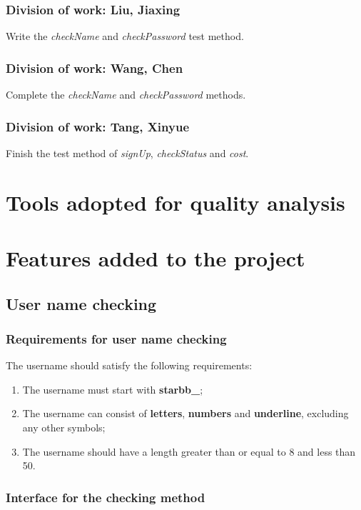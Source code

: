 \documentclass[a4paper]{report}
\begin{document}
\subsection{Division of work: Liu, Jiaxing}
Write the \emph{checkName} and \emph{checkPassword} test method.
\subsection{Division of work: Wang, Chen}
Complete the \emph{checkName} and \emph{checkPassword} methods.
\subsection{Division of work: Tang, Xinyue}
Finish the test method of \emph{signUp}, \emph{checkStatus} and \emph{cost}.


\chapter{Tools adopted for quality analysis}






\chapter{Features added to the project}
\section{User name checking}
\subsection{Requirements for user name checking}
The username should satisfy the following requirements:
\begin{enumerate}
\item The username must start with \textbf{starbb\_};
\item The username can consist of \textbf{letters}, \textbf{numbers} and \textbf{underline}, excluding any other symbols;
\item The username should have a length greater than or equal to 8 and less than 50.
\end{enumerate}
\subsection{Interface for the checking method}
\end{document}
